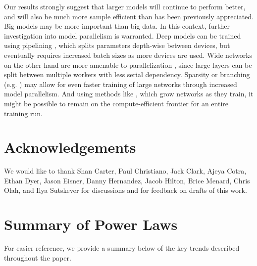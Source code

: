 \documentclass[english]{article}
\begin{document}
Our results strongly suggest that larger models will continue to perform better, and will also be much more sample efficient than has been previously appreciated.  Big models may be more important than big data.  In this context, further investigation into model parallelism is warranted. Deep models can be trained using pipelining \cite{DBLP:journals/corr/abs-1811-06965}, which splits parameters depth-wise between devices, but eventually requires increased batch sizes as more devices are used.  Wide networks on the other hand are more amenable to parallelization \cite{shazeer2018meshtensorflow}, since large layers can be split between multiple workers with less serial dependency.  Sparsity \cite{DBLP:journals/corr/abs-1904-10509,gray2017gpu} or branching (e.g. \cite{Krizhevsky:2012:ICD:2999134.2999257}) may allow for even faster training of large networks through increased model parallelism.  And using methods like \cite{Wang_2017,wen2019autogrow}, which grow networks as they train, it might be possible to remain on the compute-efficient frontier for an entire training run.


\section*{Acknowledgements}

We would like to thank Shan Carter, Paul Christiano, Jack Clark, Ajeya Cotra, Ethan Dyer, Jason Eisner, Danny Hernandez, Jacob Hilton, Brice Menard, Chris Olah, and Ilya Sutskever for discussions and for feedback on drafts of this work.


\newpage
\appendix
\appendixpage
\addappheadtotoc 


\section{Summary of Power Laws}

For easier reference, we provide a summary below of the key trends described throughout the paper.
\end{document}
